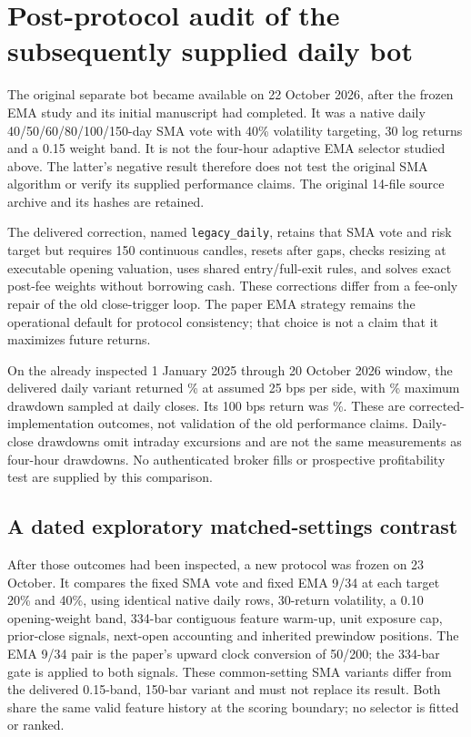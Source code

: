 \clearpage
\section{Post-protocol audit of the subsequently supplied daily bot}
\label{app:botextension}

The original separate bot became available on 22 October 2026, after the frozen
EMA study and its initial manuscript had completed. It was a native daily
40/50/60/80/100/150-day SMA vote with 40\% volatility targeting, 30 log returns
and a 0.15 weight band. It is not the four-hour adaptive EMA selector studied
above. The latter's negative result therefore does not test the original
SMA algorithm or verify its supplied performance claims. The original 14-file
source archive and its hashes are retained.

The delivered correction, named \texttt{legacy\_daily}, retains that SMA vote
and risk target but requires 150 continuous candles, resets after gaps, checks
resizing at executable opening valuation, uses shared entry/full-exit rules,
and solves exact post-fee weights without borrowing cash. These corrections
differ from a fee-only repair of the old close-trigger loop. The paper EMA
strategy remains the operational default for protocol consistency; that choice
is not a claim that it maximizes future returns.

On the already inspected 1 January 2025 through 20 October 2026 window, the delivered
daily variant returned \BotDeliveredReturn\% at assumed 25 bps per side, with
\BotDeliveredDrawdown\% maximum drawdown sampled at daily closes. Its 100 bps
return was \BotDeliveredHighCostReturn\%. These are corrected-implementation
outcomes, not validation of the old performance claims. Daily-close drawdowns
omit intraday excursions and are not the same measurements as four-hour
drawdowns. No authenticated broker fills or prospective profitability test
are supplied by this comparison.

\subsection{A dated exploratory matched-settings contrast}

After those outcomes had been inspected, a new protocol was frozen on 23 October.
It compares the fixed SMA vote and fixed EMA 9/34 at each target 20\% and 40\%,
using identical native daily rows, 30-return volatility, a 0.10 opening-weight
band, 334-bar contiguous feature warm-up, unit exposure cap, prior-close signals,
next-open accounting and inherited prewindow positions. The EMA 9/34 pair is the
paper's upward clock conversion of 50/200; the 334-bar gate is applied to both
signals. These common-setting SMA variants differ from the delivered 0.15-band,
150-bar variant and must not replace its result. Both share the same valid
feature history at the scoring boundary; no selector is fitted or ranked.


